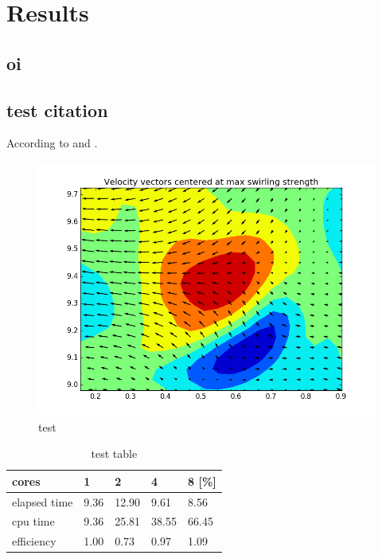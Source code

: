 \documentclass[12pt, a4paper, openany]{memoir}
\begin{document}
\chapter{Results}

\section{oi}

\section{test citation}
According to \cite{herpin2009} and \cite{raoul2016}.

\begin{figure}[h]
	\centering
	\label{fig:test}
	\includegraphics[scale=0.5]{figure/2.png}
	\caption{test}
\end{figure}

\begin{table}[h]
	\centering
	\caption{test table}
	\vspace{10px}
	\label{tb:test}
	\begin{tabular}{l|l|l|l|l}
		cores         & 1      & 2    & 4   & 8 [\%] \\
		\hline
		elapsed time  & 9.36  & 12.90  & 9.61 &  8.56 \\
		cpu time      & 9.36  & 25.81  & 38.55& 66.45 \\
		efficiency    & 1.00  & 0.73   & 0.97 & 1.09
	\end{tabular}
\end{table}

\newpage


\end{document}
